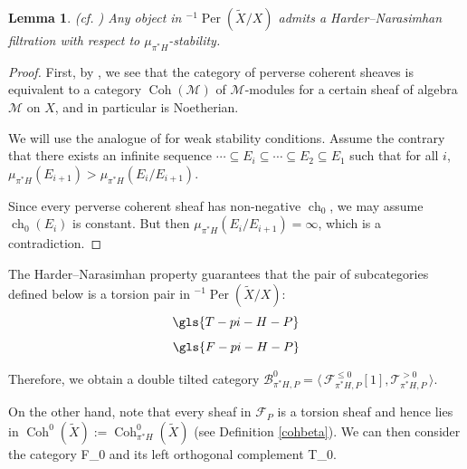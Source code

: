 \documentclass[12pt]{amsart}
\newtheorem{lemma}[theorem]{Lemma}
\theoremstyle{definition}
\DeclareMathOperator{\Coh}{Coh}
\DeclareMathOperator{\ch}{ch}
\DeclareMathOperator{\Per}{Per}
\begin{document}
\begin{lemma}\textnormal{(cf. \cite[Lemma 3.6]{Tod13})}
Any object in $^{-1}\Per(\widetilde{X}/X)$ admits a Harder--Narasimhan
filtration with respect to $\mu_{\pi^\ast H}$-stability.
\end{lemma}
\begin{proof}
First, by \cite[Prop. 3.2.7, 3.3.1]{VdB04}, 
we see that the category of perverse coherent sheaves is equivalent to a category $\Coh(\mathcal{M})$ of $\mathcal{M}$-modules for a certain sheaf of algebra $\mathcal{M}$ on $X$,
and in particular is Noetherian.

We will use the analogue of \cite[Prop. 2.4]{Bri07} for weak stability conditions.
Assume the contrary that there exists an infinite sequence $\cdots \subseteq E_i \subseteq \cdots \subseteq E_2 \subseteq E_1$ 
such that for all $i$, $\mu_{\pi^\ast H}(E_{i+1}) > \mu_{\pi^\ast H}(E_i/E_{i+1})$.

Since every perverse coherent sheaf has non-negative $\ch_0$,
we may assume $\ch_0(E_i)$ is constant.
But then $\mu_{\pi^\ast H}(E_i/E_{i+1}) = \infty$, which is a contradiction.
\end{proof}

The Harder--Narasimhan property guarantees that the pair of subcategories defined below is a torsion pair in  $^{-1}\Per(\widetilde{X}/X)$:
\[\gls{T-pi-H-P}\]
\[\gls{F-pi-H-P}\]


Therefore, we obtain a double tilted category $\mathcal{B}^0_{\pi^\ast H,P} =  \langle \, \mathcal{F}^{\leq 0}_{\pi^\ast H,P}[1], \mathcal{T}^{>0}_{\pi^\ast H,P} \, \rangle$.




On the other hand, note that every sheaf in $\mathcal{F}_P$ is a torsion sheaf and hence lies in $\Coh^0(\widetilde{X}):=\Coh^0_{\pi^\ast H}(\widetilde{X})$ (see Definition \ref{cohbeta}).
We can then consider the category \gls{F_0} and its left orthogonal complement \gls{T_0}.
\end{document}
